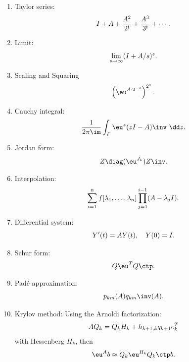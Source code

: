 \documentclass{article}
\begin{document}
\begin{enumerate}
    \item Taylor series:
    \begin{equation}\notag
        I + A + \frac{A^2}{2!} + \frac{A^3}{3!} + \cdots.
    \end{equation}
    \item Limit:
    \begin{equation}\notag
        \lim_{s\to \infty}(I + A/s)^s.
    \end{equation}
    \item Scaling and Squaring 
    \begin{equation}\notag
        \left(\eu^{A\cdot 2^{-s}}\right)^{2^s}.
    \end{equation}
    \item Cauchy integral:
    \begin{equation}\notag
        \frac{1}{2\pi\im} \int_{\varGamma}\eu^z(zI - A)\inv~\dd z.
    \end{equation}
    \item Jordan form:
    \begin{equation}\notag
        Z\diag(\eu^{J_k})Z\inv.
    \end{equation}
    \item Interpolation:
    \begin{equation}\notag
        \sum_{i=1}^n f[\lambda_1,\dots,\lambda_n]\prod_{j=1}^{i-1}(A-\lambda_jI).
    \end{equation}
    \item Differential system:
    \begin{equation}\notag
        Y'(t) = AY(t), \quad Y(0) = I.
    \end{equation}
    \item Schur form:
    \begin{equation}\notag
        Q\eu^TQ\ctp.
    \end{equation}
    \item Pad\'e approximation:
    \begin{equation}\notag
        p_{km}(A)q_{km}\inv(A).
    \end{equation}
    \item Krylov method: Using the Arnoldi factorization:
    \begin{equation}\notag
        AQ_k = Q_kH_k + h_{k+1,k}q_{k+1} e_k^T
    \end{equation}
    with Hessenberg $H_k$, then 
    \begin{equation}\notag
        \eu^Ab \approx Q_k\eu^{H_k}Q_k\ctp b.
    \end{equation}
\end{enumerate}
\end{document}
